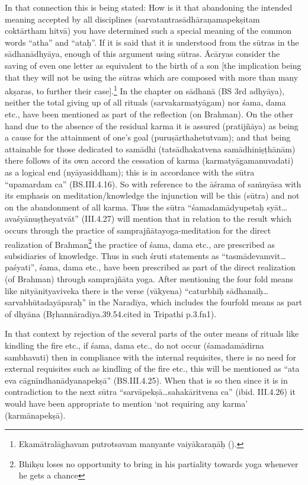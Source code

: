 In that connection this is being stated: How is it that abandoning the intended meaning accepted by all disciplines (sarvatantrasādhāraṇa\-mapekṣitam coktārtham hitvā) you have determined such a special meaning of the common words “atha” and “ataḥ”. If it is said that it is understood from the sūtras in the sādhanādhyāya, enough of this argument using sūtras. Ācāryas consider the saving of even one letter as equivalent to the birth of a son [the implication being that they will not be using the sūtras which are composed with more than many akṣaras, to further their case].\footnote{Ekamātralāghavam putrotsavam manyante vaiyākaraṇāḥ ().} In the chapter on sādhanā (BS 3rd  adhyāya), neither the total giving up of all rituals (sarvakarmatyāgam) nor śama, dama etc., have been mentioned as part of the reflection (on Brahman). On the other hand due to the absence of the residual karma it is assured (pratijñāya) as being a cause for the attainment of one’s goal (puruṣārthahetutvam); and that being attainable for those dedicated to samādhi (tatsādhakatvena samādhiniṣṭhānām) there follows of its own accord the cessation of karma (karmatyāgamanuvadati) as a logical end (nyāyasiddham); this is in accordance with the sūtra “upamardam ca” (BS.III.4.16). So with reference to the āśrama of saṁnyāsa with its emphasis on meditation/knowledge the injunction will be this (sūtra) and not on the abandonment of all karma. Thus the sūtra “śamadamādyupetaḥ syāt…avaśyānuṣṭheyatvāt” (III.4.27) will mention that in relation to the result which occurs through the practice of samprajñātayoga-meditation for the direct realization of Brahman\footnote{Bhikṣu loses no opportunity to bring in his partiality towards yoga whenever he gets a chance} the practice of śama, dama etc., are prescribed as subsidiaries of knowledge. Thus in such śruti statements as “tasmādevamvit…paśyati”, śama, dama etc., have been prescribed as part of the direct realization (of Brahman) through samprajñāta yoga. After mentioning the four fold means like nityānityaviveka there is the verse (vākyena) “caturbhiḥ sādhanaiḥ…sarvabhūta\-dayāparaḥ” in the Naradīya, which includes the fourfold means as part of dhyāna (Bṛhannāradīya.39.54.cited in Tripathi p.3.fn1).

In that context by rejection of the several parts of the outer means of rituals like kindling the fire etc., if śama, dama etc., do not occur  (śamadamādirna sambhavati) then in compliance with the internal requisites, there is no need for external requisites such as kindling of the fire etc., this will be mentioned as “ata eva cāgnīndhanādyanapekṣā” (BS.III.4.25). When that is so then since it is in contradiction to the next sūtra “sarvāpekṣā…sahakāritvena ca” (ibid. III.4.26) it would have been appropriate to mention ‘not requiring any karma’ (karmānapekṣā).

